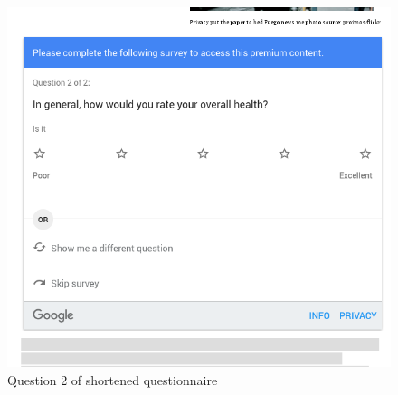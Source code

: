\begin{figure}
	\includegraphics[width=\textwidth]{Selection_355.png}
	\caption{\label{fig:qfinalshort}Question 2 of shortened questionnaire}
\end{figure}
